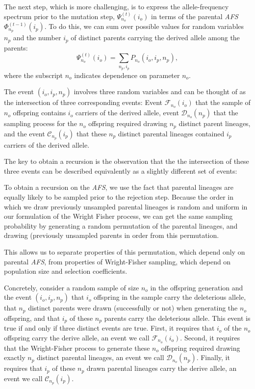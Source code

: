 \documentclass[9pt,twocolumn,twoside,lineno]{gsajnl}
\newcommand{\afs}[2]{\Phi_{#1}^{(#2)}}
\newcommand{\afsPsi}[2]{\Psi_{#1}^{(#2)}}
\begin{document}
The next step, which is more challenging, is to express the allele-frequency spectrum prior to the mutation step, $\afsPsi{n_o}{t}(i_o)$  in terms of the parental
\textit{AFS}  $\afs{n_p}{t-1}(i_p).$ To do this, we can sum over possible values for random variables $n_p$ and the number $i_p$ of distinct parents carrying the derived allele among the parents:
\begin{equation}
  \afsPsi{n_o}{t}(i_o)=\sum_{n_p,i_p} P_{n_o}(i_o,i_p,n_p),
\end{equation}
where the subscript $n_o$ indicates dependence on parameter $n_o$. 

The event $(i_o,i_p, n_p)$ involves three random variables and can be thought of as the intersection of three corresponding events: Event $\mathcal{F}_{n_o}(i_o)$ that the sample of $n_o$ offspring contains $i_o$ carriers of the derived allele, event $\mathcal{D}_{n_o}(n_p)$ that the sampling process for the $n_o$ offspring required drawing $n_p$ distinct parent lineages, and the event $\mathcal{C}_{n_p}(i_p)$ that these $n_p$ distinct parental lineages contained $i_p$ carriers of the derived allele. 

The key to obtain a recursion is the observation that the the intersection of these three events can be described equivalently as a slightly different set of events: 

To obtain a recursion on the
\textit{AFS}, we use the fact that parental lineages are equally likely to be sampled prior to the rejection step. Because the order in which we
draw previously unsampled parental lineages is random and uniform in our formulation of the Wright Fisher process, we can get the same sampling probability by generating a random permutation of the parental lineages, and drawing (previously unsampled parents in order from this permutation. 




This allows us to separate properties of this permutation,
which depend only on parental \textit{AFS}, from properties of Wright-Fisher sampling, which depend
on population size and selection coefficients.

Concretely, consider a random sample of size $n_o$ in the offspring generation and the event $(i_o, i_p, n_p)$ that $i_o$ offspring in the sample carry the deleterious allele, that $n_p$ distinct parents were drawn (successfully or not) when generating the $n_o$ offspring, and that $i_p$ of these $n_p$ parents carry the deleterious allele. This event is true if and only if three distinct events are true. First, it requires that $i_o$ of the $n_o$ offspring carry the derive allele, an event we call $\mathcal{F}_{n_o}(i_o)$. Second, it requires that the
Wright-Fisher process to generate these $n_o$ offspring required drawing exactly $n_p$ distinct parental lineages, an event we call $\mathcal{D}_{n_o}(n_p)$. Finally, it requires that $i_p$ of these $n_p$ drawn parental lineages carry the derive allele, an event we call  $\mathcal{C}_{n_p}(i_p).$
\end{document}

